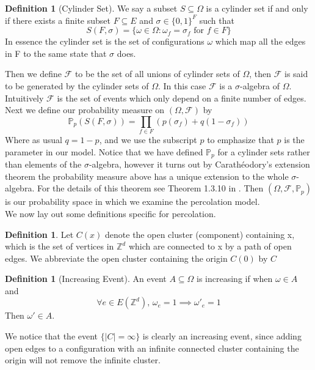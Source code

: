 \documentclass[a4paper,11pt]{article}
\theoremstyle{definition}
\newtheorem{definition}[theorem]{Definition}
\newcommand{\ints}{\mathbb{Z}}
\newcommand{\sigalg}{$\sigma$-algebra }
\newcommand{\prob}{\mathbb{P}_p}
\begin{document}
\begin{definition}[Cylinder Set]
	We say a subset $S \subseteq \Omega$ is a cylinder set if and only if there exists a finite subset $F \subseteq E$ and $\sigma \in \{0,1\}^F$ such that 
	$$S(F,\sigma) = \{\omega \in \Omega: \omega_f = \sigma_f \text{ for }f \in F\}$$
	In essence the cylinder set is the set of configurations $\omega$ which map all the edges in F to the same state that $\sigma$ does.
\end{definition}

Then we define $\mathcal{F}$ to be the set of all unions of cylinder sets of $\Omega$, then $\mathcal{F}$ is said to be generated by the cylinder sets of $\Omega$.
In this case $\mathcal{F}$ is a \sigalg of $\Omega$. Intuitively $\mathcal{F}$ is the set of events which only depend on a finite number of edges.\\
Next we define our probability measure on $(\Omega, \mathcal{F})$ by 
$$\prob(S(F,\sigma)) = \prod_{f \in F} (p(\sigma_f) + q(1-\sigma_f)) $$
Where as usual $q = 1-p$, and we use the subscript $p$ to emphasize that $p$ is the parameter in our model. 
Notice that we have defined $\prob$ for a cylinder sets rather than elements of the $\sigma$-algebra, however it turns out by
Carathéodory's extension theorem the probability measure above has a unique extension to the whole $\sigma$-algebra.
For the details of this theorem see Theorem 1.3.10 in \cite{ash2000probability}.
Then $(\Omega, \mathcal{F}, \prob)$ is our probability space in which we examine the percolation model.
\\
We now lay out some definitions specific for percolation.
\begin{definition}
	Let $C(x)$ denote the open cluster (component) containing x, which is the set of vertices in $\ints^d$ which are connected to x by a path of open edges.
	We abbreviate the open cluster containing the origin $C(0)$ by $C$
\end{definition}

\begin{definition}[Increasing Event]
	An event $ A \subseteq \Omega$ is increasing if when $\omega \in A$ and
	$$\forall e \in E(\ints^d) \text{, } \omega_e = 1 \implies \omega'_e = 1$$
	Then $\omega' \in A$. 
	\end{definition} 

	We notice that the event $\{|C| = \infty\}$ is clearly an increasing event, since adding open edges to a configuration with an infinite connected cluster containing the origin will not remove the infinite cluster.
\end{document}
